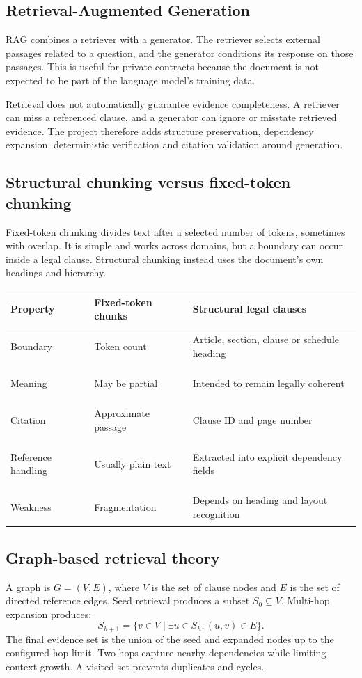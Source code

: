 \documentclass[11pt,letterpaper]{article}
\begin{document}
\subsection{Retrieval-Augmented Generation}
RAG combines a retriever with a generator. The retriever selects external passages related to a question, and the generator conditions its response on those passages. This is useful for private contracts because the document is not expected to be part of the language model's training data.

Retrieval does not automatically guarantee evidence completeness. A retriever can miss a referenced clause, and a generator can ignore or misstate retrieved evidence. The project therefore adds structure preservation, dependency expansion, deterministic verification and citation validation around generation.

\subsection{Structural chunking versus fixed-token chunking}
Fixed-token chunking divides text after a selected number of tokens, sometimes with overlap. It is simple and works across domains, but a boundary can occur inside a legal clause. Structural chunking instead uses the document's own headings and hierarchy.
\par\smallskip
\begin{longtable}{>{\bfseries\raggedright\arraybackslash}p{}>{\raggedright\arraybackslash}p{}>{\raggedright\arraybackslash}p{}}
\toprule
Property & Fixed-token chunks & Structural legal clauses\\
\midrule
Boundary & Token count & Article, section, clause or schedule heading\\
Meaning & May be partial & Intended to remain legally coherent\\
Citation & Approximate passage & Clause ID and page number\\
Reference handling & Usually plain text & Extracted into explicit dependency fields\\
Weakness & Fragmentation & Depends on heading and layout recognition\\
\bottomrule
\end{longtable}

\subsection{Graph-based retrieval theory}
A graph is $G=(V,E)$, where $V$ is the set of clause nodes and $E$ is the set of directed reference edges. Seed retrieval produces a subset $S_0 \subseteq V$. Multi-hop expansion produces:
\[
S_{h+1}=\{v \in V \mid \exists u \in S_h, (u,v) \in E\}.
\]
The final evidence set is the union of the seed and expanded nodes up to the configured hop limit. Two hops capture nearby dependencies while limiting context growth. A visited set prevents duplicates and cycles.
\end{document}
